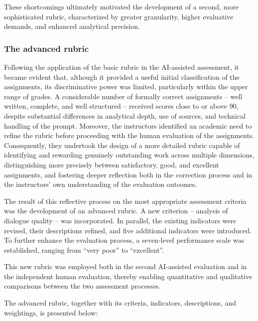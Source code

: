 \documentclass[english]{textolivre}
\begin{document}
These shortcomings ultimately motivated the development of a second, more sophisticated rubric, characterized by greater granularity, higher evaluative demands, and enhanced analytical precision.

\subsubsection{The advanced rubric}
Following the application of the basic rubric in the AI-assisted assessment, it became evident that, although it provided a useful initial classification of the assignments, its discriminative power was limited, particularly within the upper range of grades. A considerable number of formally correct assignments -- well written, complete, and well structured -- received scores close to or above 90, despite substantial differences in analytical depth, use of sources, and technical handling of the prompt. Moreover, the instructors identified an academic need to refine the rubric before proceeding with the human evaluation of the assignments. Consequently, they undertook the design of a more detailed rubric capable of identifying and rewarding genuinely outstanding work across multiple dimensions, distinguishing more precisely between satisfactory, good, and excellent assignments, and fostering deeper reflection both in the correction process and in the instructors’ own understanding of the evaluation outcomes.

The result of this reflective process on the most appropriate assessment criteria was the development of an advanced rubric. A new criterion -- analysis of dialogue quality -- was incorporated. In parallel, the existing indicators were revised, their descriptions refined, and five additional indicators were introduced. To further enhance the evaluation process, a seven-level performance scale was established, ranging from ``very poor'' to ``excellent''.

This new rubric was employed both in the second AI-assisted evaluation and in the independent human evaluation, thereby enabling quantitative and qualitative comparisons between the two assessment processes.

The advanced rubric, together with its criteria, indicators, descriptions, and weightings, is presented below:
\end{document}
